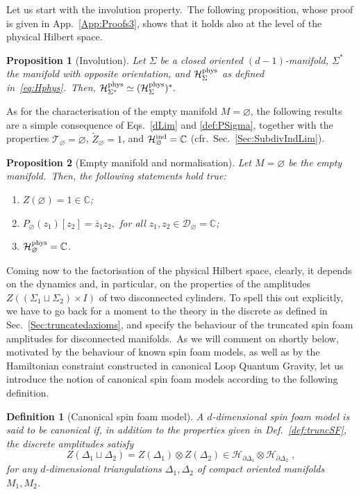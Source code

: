 \documentclass[11pt]{article}
\newcommand{\C}{\mathbb{C}}
\newcommand{\Hil}{\mathcal{H}}
\newcommand{\cD}{\mathcal{D}}
\newcommand{\Hphys}{\mathcal{H}_{\Sigma}^{\rm phys}}
\newcommand{\h}{\mathcal{H}}
\newtheorem{proposition}{Proposition}[section]
\newtheorem{definition}{Definition}[section]
\theoremstyle{definition}
\numberwithin{equation}{section}
\begin{document}
Let us start with the involution property.~The following proposition, whose proof is given in App.~\ref{App:Proofs3}, shows that it holds also at the level of the physical Hilbert space.  
\begin{proposition}[Involution]
\label{prop:physdual} Let $\Sigma$ be a closed oriented $(d-1)$-manifold, $\Sigma^*$ the manifold with opposite orientation, and $\Hphys$ as defined in~\eqref{eq:Hphys}.~Then,
    $\Hil^{\rm phys}_{\Sigma^*}\simeq(\Hphys)^*.$
\end{proposition}
\noindent
As for the characterisation of the empty manifold $M=\varnothing$, the following results are a simple consequence of Eqs.~\eqref{dLim} and \eqref{def:PSigma}, together with the properties $\mathcal{T}_\varnothing=\varnothing$, $\tilde{Z}_\varnothing=1$, and $\Hil^{\rm ind}_{\varnothing}=\C$ (cfr.~Sec.~\ref{Sec:SubdivIndLim}).
\begin{proposition}[Empty manifold and normalisation]
    Let $M=\varnothing$ be the empty manifold.~Then, the following statements hold true:
    \begin{enumerate}
        \item $Z(\varnothing)=1\in\C$;
        \item $P_{\varnothing}(z_1)[z_2]=\bar{z}_1z_2,$ for all $z_1,z_2\in\cD_{\varnothing}=\C$;
        \item $\Hil^{\rm phys}_{\varnothing}=\C$.
    \end{enumerate}
\end{proposition}
Coming now to the factorisation of the physical Hilbert space, clearly, it depends on the dynamics and, in particular, on the properties of the amplitudes $Z((\Sigma_1\sqcup\Sigma_2)\times I)$ of two disconnected cylinders. To spell this out explicitly, we have to go back for a moment to the theory in the discrete as defined in Sec.~\ref{Sec:truncatedaxioms}, and specify the behaviour of the truncated spin foam amplitudes for disconnected manifolds.~As we will comment on shortly below, motivated by the behaviour of known spin foam models, as well as by the Hamiltonian constraint constructed in canonical Loop Quantum Gravity, let us introduce the notion of canonical spin foam models according to the following definition.
\begin{definition}[Canonical spin foam model]
    \label{def:split}
    A $d$-dimensional spin foam model is said to be \emph{canonical} if, in addition to the properties given in \emph{Def.~\ref{def:truncSF}}, the discrete amplitudes satisfy
    \begin{equation}\label{eq:canSF}
        Z(\Delta_1\sqcup\Delta_2)=Z(\Delta_1)\otimes Z(\Delta_2)\in\h_{\partial\Delta_1}\otimes\h_{\partial\Delta_2}\;,
    \end{equation}
    for any $d$-dimensional triangulations $\Delta_1,\Delta_2$ of compact oriented manifolds $M_1,M_2$.
\end{definition}
\end{document}
